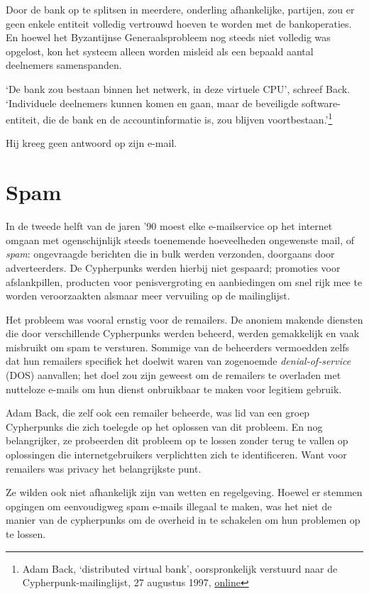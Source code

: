 \documentclass[smalldemyvopaper,11pt,twoside,onecolumn,openright,extrafontsizes,hidelinks]{memoir}
\begin{document}
Door de bank op te splitsen in meerdere, onderling afhankelijke,
partijen, zou er geen enkele entiteit volledig vertrouwd hoeven te
worden met de bankoperaties. En hoewel het Byzantijnse Generaalsprobleem
nog steeds niet volledig was opgelost, kon het systeem alleen worden
misleid als een bepaald aantal deelnemers samenspanden.

`De bank zou bestaan binnen het netwerk, in deze virtuele CPU', schreef
Back. `Individuele deelnemers kunnen komen en gaan, maar de beveiligde
software-entiteit, die de bank en de accountinformatie is, zou blijven
voortbestaan.'\footnote{Adam Back, `distributed virtual bank',
  oorspronkelijk verstuurd naar de Cypherpunk-mailinglijst, 27 augustus
  1997,
  \href{https://cypherpunks.venona.com/date/1997/08/msg01289.html}{online}}

Hij kreeg geen antwoord op zijn e-mail.

\section{Spam}\label{spam}

In de tweede helft van de jaren '90 moest elke e-mailservice op het
internet omgaan met ogenschijnlijk steeds toenemende hoeveelheden
ongewenste mail, of \emph{spam}: ongevraagde berichten die in bulk
werden verzonden, doorgaans door adverteerders. De Cypherpunks werden
hierbij niet gespaard; promoties voor afslankpillen, producten voor
penisvergroting en aanbiedingen om snel rijk mee te worden veroorzaakten
alsmaar meer vervuiling op de mailinglijst.

Het probleem was vooral ernstig voor de remailers. De anoniem makende
diensten die door verschillende Cypherpunks werden beheerd, werden
gemakkelijk en vaak misbruikt om spam te versturen. Sommige van de
beheerders vermoedden zelfs dat hun remailers specifiek het doelwit
waren van zogenoemde \emph{denial-of-service} (DOS) aanvallen; het doel
zou zijn geweest om de remailers te overladen met nutteloze e-mails om
hun dienst onbruikbaar te maken voor legitiem gebruik.

Adam Back, die zelf ook een remailer beheerde, was lid van een groep
Cypherpunks die zich toelegde op het oplossen van dit probleem. En nog
belangrijker, ze probeerden dit probleem op te lossen zonder terug te
vallen op oplossingen die internetgebruikers verplichtten zich te
identificeren. Want voor remailers was privacy het belangrijkste punt.

Ze wilden ook niet afhankelijk zijn van wetten en regelgeving. Hoewel er
stemmen opgingen om eenvoudigweg spam e-mails illegaal te maken, was het
niet de manier van de cypherpunks om de overheid in te schakelen om hun
problemen op te lossen.
\end{document}
